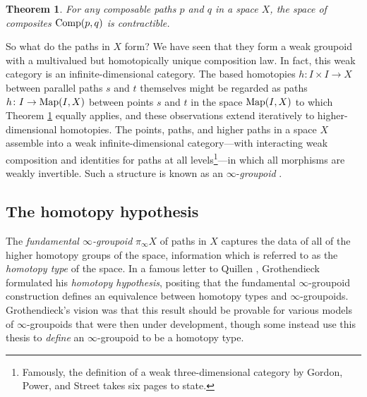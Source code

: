 \documentclass[11pt]{ctexart}
\newtheorem{thm}{Theorem}[section]
\theoremstyle{definition}
\theoremstyle{remark}
\numberwithin{equation}{section}
\newcommand{\Map}{\textup{Map}}
\newcommand{\Comp}{\textup{Comp}}
\newcommand{\1}{\mathbbe{1}}
\newcommand{\2}{\mathbbe{2}}
\newcommand{\3}{\mathbbe{3}}
\begin{document}
\begin{thm}\label{thm:unique-composition} For any composable paths $p$ and $q$ in a space $X$, the space of composites $\Comp(p,q)$ is contractible.
\end{thm}

So what do the paths in $X$ form? We have seen that they form a weak groupoid with a multivalued but homotopically unique composition law. In fact, this weak category is an infinite-dimensional category. The based homotopies $h \colon I \times I \to X$ between parallel paths $s$ and $t$ themselves might be regarded as paths $h \colon I \to \Map(I,X)$ between points $s$ and $t$ in the space $\Map(I,X)$ to which Theorem \ref{thm:unique-composition} equally applies, and these observations extend iteratively to higher-dim\-en\-sion\-al homotopies. The points, paths, and higher paths in a space $X$ assemble into a weak infinite-dimensional category---with interacting weak composition and identities for paths at all levels\footnote{Famously, the definition of a weak three-dimensional category by Gordon, Power, and Street takes six pages to state.}---in which all morphisms are weakly invertible. Such a structure is known as an $\infty$-\emph{groupoid} \cite{lurie-what}.

\subsection*{The homotopy hypothesis}

The \emph{fundamental $\infty$-groupoid} $\pi_\infty X$ of paths in $X$ captures the data of all of the higher homotopy groups of the space, information which is referred to as the \emph{homotopy type} of the space. In a famous letter to Quillen \cite{G-PS}, Grothendieck formulated his \emph{homotopy hypothesis}, positing that the fundamental $\infty$-groupoid construction defines an equivalence between homotopy types and $\infty$-groupoids. Grothendieck's vision was that this result should be provable for various models of $\infty$-groupoids that were then under development, though some instead use this thesis to \emph{define} an $\infty$-groupoid to be a homotopy type.
\end{document}
